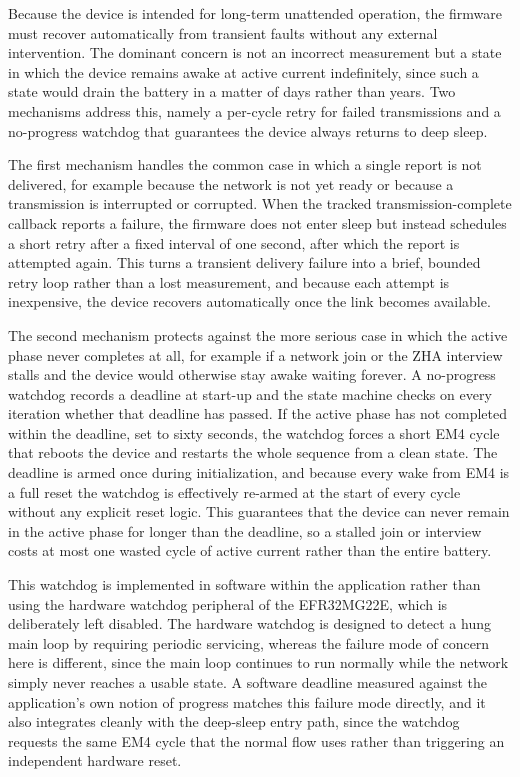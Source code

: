 Because the device is intended for long-term unattended operation, the firmware must recover automatically from transient faults without any external intervention.
The dominant concern is not an incorrect measurement but a state in which the device remains awake at active current indefinitely, since such a state would drain the battery in a matter of days rather than years.
Two mechanisms address this, namely a per-cycle retry for failed transmissions and a no-progress watchdog that guarantees the device always returns to deep sleep.

The first mechanism handles the common case in which a single report is not delivered, for example because the network is not yet ready or because a transmission is interrupted or corrupted.
When the tracked transmission-complete callback reports a failure, the firmware does not enter sleep but instead schedules a short retry after a fixed interval of one second, after which the report is attempted again.
This turns a transient delivery failure into a brief, bounded retry loop rather than a lost measurement, and because each attempt is inexpensive, the device recovers automatically once the link becomes available.

The second mechanism protects against the more serious case in which the active phase never completes at all, for example if a network join or the ZHA interview stalls and the device would otherwise stay awake waiting forever.
A no-progress watchdog records a deadline at start-up and the state machine checks on every iteration whether that deadline has passed.
If the active phase has not completed within the deadline, set to sixty seconds, the watchdog forces a short EM4 cycle that reboots the device and restarts the whole sequence from a clean state.
The deadline is armed once during initialization, and because every wake from EM4 is a full reset the watchdog is effectively re-armed at the start of every cycle without any explicit reset logic.
This guarantees that the device can never remain in the active phase for longer than the deadline, so a stalled join or interview costs at most one wasted cycle of active current rather than the entire battery.

This watchdog is implemented in software within the application rather than using the hardware watchdog peripheral of the EFR32MG22E, which is deliberately left disabled.
The hardware watchdog is designed to detect a hung main loop by requiring periodic servicing, whereas the failure mode of concern here is different, since the main loop continues to run normally while the network simply never reaches a usable state.
A software deadline measured against the application's own notion of progress matches this failure mode directly, and it also integrates cleanly with the deep-sleep entry path, since the watchdog requests the same EM4 cycle that the normal flow uses rather than triggering an independent hardware reset.

